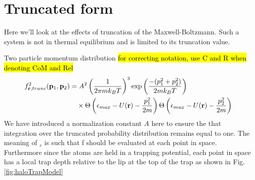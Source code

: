 \section{Truncated form}\label{sec:truncDist}
Here we'll look at the effects of truncation of the Maxwell-Boltzmann.
Such a system is not in thermal equilibrium and is limited to its truncation value.

Two particle momentum distribution \hl{for correcting notation, use C and R when denoting CoM and Rel}
\begin{equation}
\begin{split}
	f^2_{\mathbf{r},trunc} (\mathbf{p}_1, \mathbf{p}_2) &= A^2 \left(\frac{1}{2 \pi m k_B T}\right)^3 \text{exp}\left( { \frac{-(p_1^2 + p_2^2)}{2 m k_B T}} \right) \\ &\quad \times \Theta \left( {\epsilon_{max} - U(\mathbf{r}) - \frac{p_1^2}{2m}} \right) \Theta \left( {\epsilon_{max} - U(\mathbf{r}) - \frac{p_2^2}{2m}} \right)
\end{split}
\end{equation}
We have introduced a normalization constant $A$ here to ensure the that integration over the truncated probability distribution remains equal to one.
The meaning of $_r$ is such that f should be evaluated at each point in space. Furthermore since the atoms are held in a trapping potential, each point in space has a local trap depth relative to the lip at the top of the trap as shown in Fig.\,\ref{fig:haloTrapModel}

